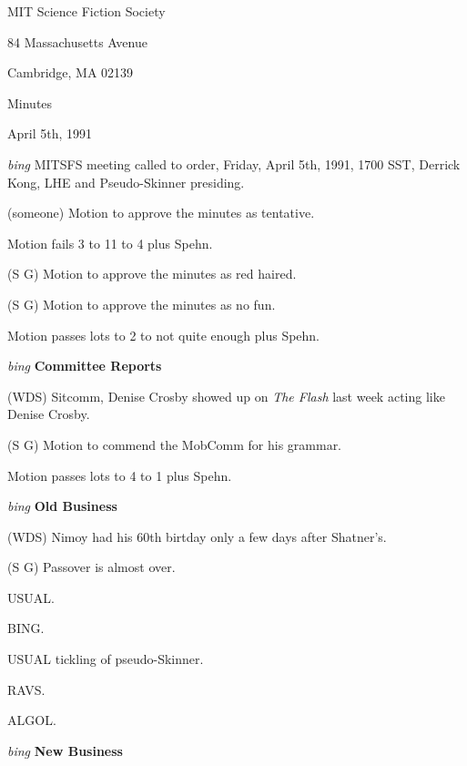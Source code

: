\setlength{\topmargin}{-0.5in}
\setlength{\oddsidemargin}{0.0in}
\setlength{\evensidemargin}{0.0in}
\setlength{\textheight}{9in}
\setlength{\textwidth}{6.5in}



\begin{center}
MIT Science Fiction Society

84 Massachusetts Avenue

Cambridge, MA 02139

\vspace{0.2in}
Minutes

April 5th, 1991

\end{center}

\vspace{0.15in}
{\em bing\/}  MITSFS meeting called to order, Friday, April 5th, 1991,
1700 SST, Derrick Kong, LHE and Pseudo-Skinner presiding.

(someone) Motion to approve the minutes as tentative.

Motion fails 3 to 11 to 4 plus Spehn.

(S G) Motion to approve the minutes as red haired.

(S G) Motion to approve the minutes as no fun.

Motion passes lots to 2 to not quite enough plus Spehn.

\vspace{0.15in}
{\em bing\/} {\bf Committee Reports\/}

(WDS) Sitcomm, Denise Crosby showed up on {\em The Flash\/} last week acting
like Denise Crosby.

(S G) Motion to commend the MobComm for his grammar.

Motion passes lots to 4 to 1 plus Spehn.

\vspace{.15in}
{\em bing\/} {\bf Old Business\/}

(WDS) Nimoy had his 60th birtday only a few days after Shatner's.

(S G) Passover is almost over.

USUAL.

BING.

USUAL tickling of pseudo-Skinner.

RAVS.

ALGOL.

\vspace{0.15in}
{\em bing\/} {\bf New Business\/}

